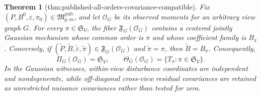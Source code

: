 \documentclass{article}
\newtheorem{theorem}{Theorem}
\begin{document}
\begin{theorem}[thm:published-all-orders-covariance-compatible]\label{thm:published-all-orders-covariance-compatible}
Fix \((P,B^0,\varepsilon,\pi_0)\in\mathfrak M_{p,m}^{\mathrm{pub}}\), and let \(\mathcal O_G\) be its observed moments for an arbitrary view graph \(G\). For every \(\pi\in\mathfrak S_V\), the fiber \(\mathfrak F_G(\mathcal O_G)\) contains a centered jointly Gaussian mechanism whose common order is \(\pi\) and whose coefficient family is \(B_\pi\). Conversely, if \((\widetilde P,\widetilde B,\widetilde\varepsilon,\widetilde\pi)\in\mathfrak F_G(\mathcal O_G)\) and \(\widetilde\pi=\pi\), then \(\widetilde B=B_\pi\). Consequently,
\[
 \Pi_G(\mathcal O_G)=\mathfrak S_V,
 \qquad
 \Theta_G(\mathcal O_G)=\{T_\pi:\pi\in\mathfrak S_V\}.
\]
In the Gaussian witnesses, within-view disturbance coordinates are independent and nondegenerate, while off-diagonal cross-view residual covariances are retained as unrestricted nuisance covariances rather than tested for zero.
\end{theorem}
\end{document}
